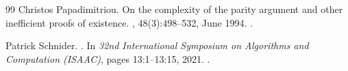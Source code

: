 \documentclass[10pt,a4paper]{article}
\theoremstyle{definition}
\theoremstyle{plain}
\theoremstyle{remark}
\begin{document}
\begin{thebibliography}{99}
Christos Papadimitriou.
\newblock On the complexity of the parity argument and other inefficient proofs
  of existence.
, 48(3):498--532, June
  1994.
\newblock \href {https://doi.org/10.1016/s0022-0000(05)80063-7}
  {}.

Patrick Schnider.
.
\newblock In {\em 32nd International Symposium on Algorithms and Computation
  (ISAAC)}, pages 13:1--13:15, 2021.
\newblock \href {https://doi.org/10.4230/LIPIcs.ISAAC.2021.13}
  {}.

\end{thebibliography}
\end{document}
